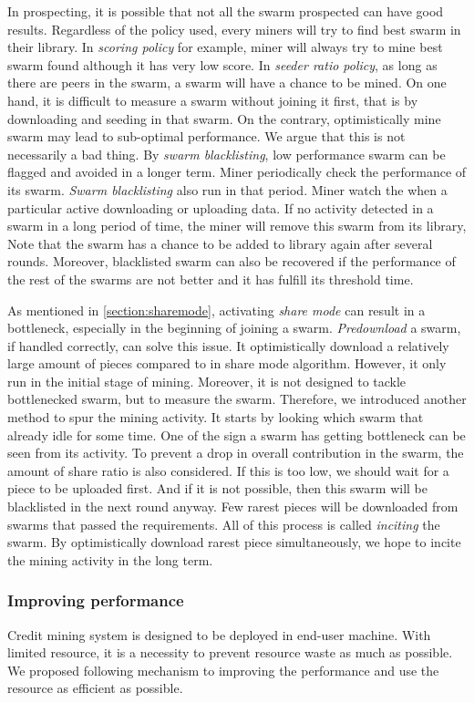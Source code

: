 In prospecting, it is possible that not all the swarm prospected can have good results. Regardless of the policy used, every miners will try to find best swarm in their library. In \textit{scoring policy} for example, miner will always try to mine best swarm found although it has very low score. In \textit{seeder ratio policy}, as long as there are peers in the swarm, a swarm will have a chance to be mined. On one hand, it is difficult to measure a swarm without joining it first, that is by downloading and seeding in that swarm. On the contrary, optimistically mine swarm may lead to sub-optimal performance. We argue that this is not necessarily a bad thing. By \textit{swarm blacklisting}, low performance swarm can be flagged and avoided in a longer term. Miner periodically check the performance of its swarm. \textit{Swarm blacklisting} also run in that period. Miner watch the when a particular active downloading or uploading data. If no activity detected in a swarm in a long period of time, the miner will remove this swarm from its library, Note that the swarm has a chance to be added to library again after several rounds. Moreover, blacklisted swarm can also be recovered if the performance of the rest of the swarms are not better and it has fulfill its threshold time. 

As mentioned in \ref{section:sharemode}, activating \textit{share mode} can result in a bottleneck, especially in the beginning of joining a swarm. \textit{Predownload} a swarm, if handled correctly, can solve this issue. It optimistically download a relatively large amount of pieces compared to in share mode algorithm. However, it only run in the initial stage of mining. Moreover, it is not designed to tackle bottlenecked swarm, but to measure the swarm. Therefore, we introduced another method to spur the mining activity. It starts by looking which swarm that already idle for some time. One of the sign a swarm has getting bottleneck can be seen from its activity. To prevent a drop in overall contribution in the swarm, the amount of share ratio is also considered. If this is too low, we should wait for a piece to be uploaded first. And if it is not possible, then this swarm will be blacklisted in the next round anyway. Few rarest pieces will be downloaded from swarms that passed the requirements. All of this process is called \textit{inciting} the swarm. By optimistically download rarest piece simultaneously, we hope to incite the mining activity in the long term.

\subsubsection{Improving performance}
Credit mining system is designed to be deployed in end-user machine. With limited resource, it is a necessity to prevent resource waste as much as possible. We proposed following mechanism to improving the performance and use the resource as efficient as possible. 


